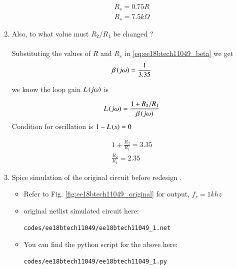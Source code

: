 \begin{enumerate}[label=\arabic*.,ref=\theenumi]
\begin{align}
   R_s = 0.75R \\
   R_s = 7.5k\Omega 
\end{align}


\item Also, to what value must $R_2/R_1$ be changed ?
\\
\\
\solution Substituting the values of $R $ and $ R_s$ in \ref{eq:ee18btech11049_beta} we get
\begin{align}
    \beta\left(j\omega\right) = \frac{1}{3.35}
\end{align}
%

we know the loop gain $L\left(j\omega\right)$ is


\begin{align}
    L\left(j\omega\right) = \frac{1+R_2/R_1}{\beta \left(j\omega\right)}
\end{align}
Condition for oscillation is $1-L\left(s\right) = 0$

\begin{align}
    1 + \frac{R_2}{R_1} = 3.35 \\
    \frac{R_2}{R_1} = 2.35
\end{align}


\item Spice simulation of the original circuit before redesign . 
\\

\solution 

\begin{itemize}
\item Refer to Fig. \ref{fig:ee18btech11049_original}
 for output, $f_r = 1 khz $
\item original netlist simulated circuit here:
\begin{lstlisting}
codes/ee18btech11049/ee18btech11049_1.net
\end{lstlisting}
\item You can find the python script for the above here:
\begin{lstlisting}
codes/ee18btech11049/ee18btech11049_1.py
\end{lstlisting}
\end{itemize}


\end{enumerate}
